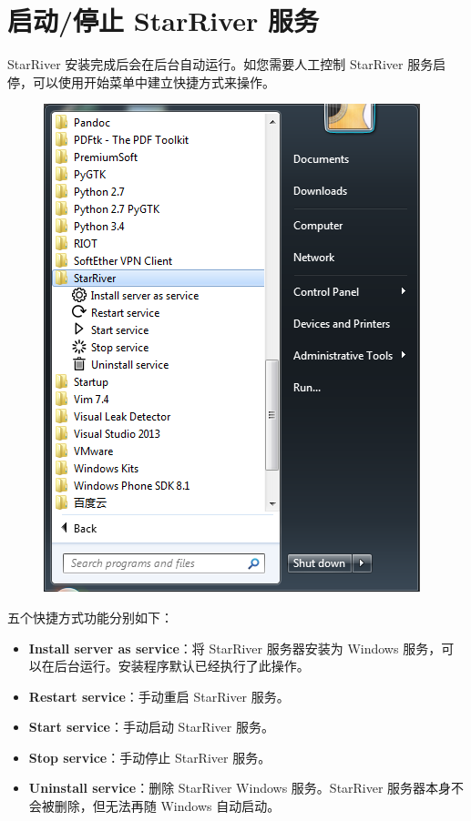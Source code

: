 \section{启动/停止 StarRiver
服务}\label{ux542fux52a8ux505cux6b62-starriver-ux670dux52a1}

StarRiver 安装完成后会在后台自动运行。如您需要人工控制 StarRiver
服务启停，可以使用开始菜单中建立快捷方式来操作。

\begin{figure}[htbp]
\centering
\includegraphics{img/shortcuts.png}
\end{figure}

五个快捷方式功能分别如下：

\begin{itemize}
\itemsep1pt\parskip0pt
\item
  \textbf{Install server as service}：将 StarRiver 服务器安装为 Windows
  服务，可以在后台运行。安装程序默认已经执行了此操作。
\item
  \textbf{Restart service}：手动重启 StarRiver 服务。
\item
  \textbf{Start service}：手动启动 StarRiver 服务。
\item
  \textbf{Stop service}：手动停止 StarRiver 服务。
\item
  \textbf{Uninstall service}：删除 StarRiver Windows 服务。StarRiver
  服务器本身不会被删除，但无法再随 Windows 自动启动。
\end{itemize}

